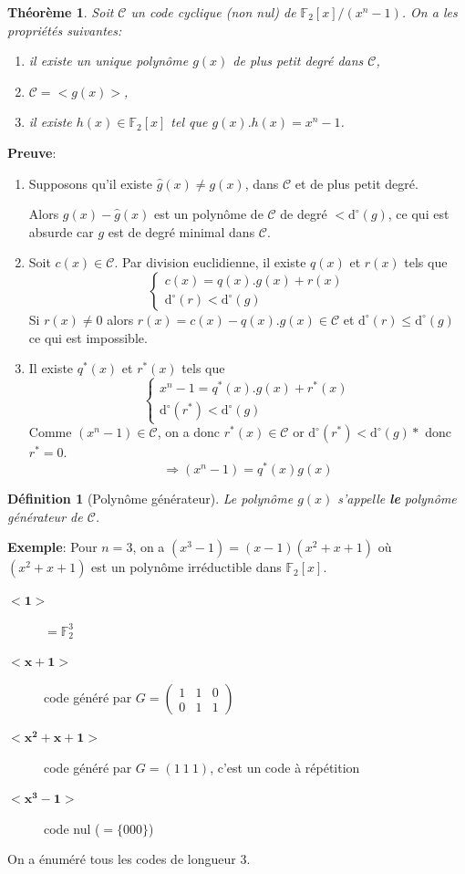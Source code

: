 \documentclass[a4paper,10pt,twocolumn]{article}
\theoremstyle{break}
\newcommand{\code}[1]{\mathcal{#1}}
\newcommand{\C}{\code{C}}
\newcommand{\F}{\mathbb{F}}
\newcommand{\FF}{\F_2}
\newcommand{\FFn}[1]{\FF^{#1}}
\newcommand{\dg}[1]{\mathrm{d}^\circ(#1)}
\newcommand{\cy}[1]{{<}#1{>}}
\newtheorem{mydef}{Définition}
\newtheorem{myth}{Théorème}
\newenvironment{note}[1]
{\textbf{#1}:}
{}
\newenvironment{myproof}
{\begin{note}{Preuve}}
{\end{note}}
\newenvironment{exemple}
{\begin{note}{Exemple}}
{\end{note}}
\begin{document}
\begin{myth}
 Soit $\C$ un code cyclique (non nul) de $\FF[x]/(x^n-1)$. On a les propriétés suivantes:
 \begin{enumerate}
  \item il existe un unique polynôme $g(x)$ de plus petit degré dans $\C$,
  \item $\C = \cy{g(x)}$,
  \item il existe $h(x) \in \FF[x]$ tel que $g(x).h(x) = x^n-1$.
 \end{enumerate}
\end{myth}

\begin{myproof}
 \begin{enumerate}
  \item Supposons qu'il existe $\hat{g}(x) \ne g(x)$, dans $\C$ et de plus petit degré.

   Alors $g(x) - \hat{g}(x)$ est un polynôme de $\C$ de degré $< \dg{g}$, ce qui est absurde
   car $g$ est de degré minimal dans $\C$.
  \item Soit $c(x) \in \C$. Par division euclidienne, il existe $q(x)$ et $r(x)$ tels que
   $$ \left\{ \begin{array}{l} c(x) = q(x).g(x) + r(x) \\ \dg{r} < \dg{g} \end{array} \right. $$
   Si $r(x) \ne 0$ alors $r(x) = c(x) - q(x).g(x) \in \C$ et $\dg{r} \le \dg{g}$ ce qui est impossible.
  \item Il existe $q^*(x)$ et $r^*(x)$ tels que
  $$ \left\{ \begin{array}{l} x^n-1 = q^*(x).g(x) + r^*(x) \\ \dg{r^*} < \dg{g} \end{array} \right. $$
  Comme $(x^n-1) \in \C$, on a donc $r^*(x) \in \C$ or $\dg{r^*} < \dg{g}*$ donc $r^* = 0$.
  $$\Longrightarrow (x^n-1) = q^*(x)g(x)$$
 \end{enumerate}
\end{myproof}

\begin{mydef}[Polynôme générateur]
 Le polynôme $g(x)$ s'appelle \textbf{le} polynôme générateur de $\C$.
\end{mydef}

\begin{exemple}
 Pour $n = 3$, on a $ (x^3-1) = (x-1)(x^2+x+1) $
 où $(x^2+x+1)$ est un polynôme irréductible dans $\FF[x]$.

 \begin{description}
  \item[$\mathbf{\cy{1}}$] $= \FFn{3}$
  \item[$\mathbf{\cy{x+1}}$] code généré par $G = \begin{pmatrix} 1 & 1 & 0 \\ 0 & 1 & 1 \end{pmatrix}$
  \item[$\mathbf{\cy{x^2+x+1}}$] code généré par $G= (1\ 1\ 1)$, c'est un code à répétition
  \item[$\mathbf{\cy{x^3-1}}$] code nul ($=\{000\}$)
 \end{description}
 On a énuméré tous les codes de longueur 3.
\end{exemple}
\end{document}
